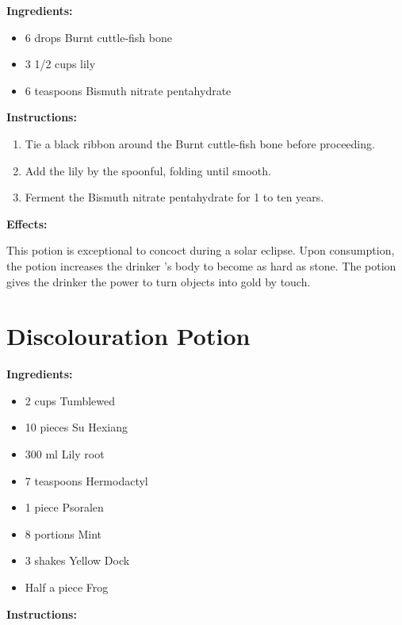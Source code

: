 \documentclass{article}
\begin{document}
\textbf{Ingredients:}

\begin{itemize}
  \item 6 drops Burnt cuttle-fish bone
  \item 3 1/2 cups lily
  \item 6 teaspoons Bismuth nitrate pentahydrate
\end{itemize}

\textbf{Instructions:}

\begin{enumerate}
  \item Tie a black ribbon around the Burnt cuttle-fish bone before proceeding.
  \item Add the lily by the spoonful, folding until smooth.
  \item Ferment the Bismuth nitrate pentahydrate for 1 to ten years.
\end{enumerate}

\textbf{Effects:}

This potion is exceptional to concoct during a solar eclipse. Upon consumption, the potion increases the drinker 's body to become as hard as stone. The potion gives the drinker the power to turn objects into gold by touch.

\newpage
\section*{Discolouration Potion}

\textbf{Ingredients:}

\begin{itemize}
  \item 2 cups Tumblewed
  \item 10 pieces Su Hexiang
  \item 300 ml Lily root
  \item 7 teaspoons Hermodactyl
  \item 1 piece Psoralen
  \item 8 portions Mint
  \item 3 shakes Yellow Dock
  \item Half a piece Frog
\end{itemize}

\textbf{Instructions:}
\end{document}
